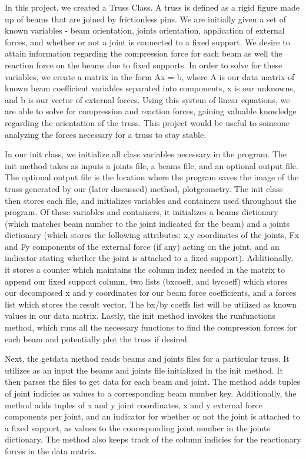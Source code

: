 \documentclass{article}
\begin{document}
In this project, we created a Truss Class. A truss is defined as a rigid
figure made up of beams that are joined by frictionless pins.
We are initially given a set of known variables - 
beam orientation, joints orientation, application of external forces, 
and whether or not a joint is connected to a fixed support. We desire 
to attain information regarding the compression force for each beam 
as well the reaction force on the beams due to fixed supports. In order
to solve for these variables, we create a matrix in the form Ax = b, 
where A is our data matrix of known beam coefficient variables separated
into components, x is our unknowns, and b is our vector of external forces.
Using this system of linear equations, we are able to solve for 
compression and reaction forces, gaining valuable knowledge regarding 
the orientation of the truss. This project would be useful to someone 
analyzing the forces necessary for a truss to stay stable. 

In our init class, we initialize all class variables necessary in the 
program. The init method takes as inputs a joints file, a beams file, and
an optional output file. The optional output file is the location where
the program saves the image of the truss generated by our (later discussed)
method, plotgeometry. The init class then stores each file, and initializes
variables and containers used throughout the program. Of these variables 
and containers, it initializes a beams dictionary (which matches beam 
number to the joint indicated for the beam) and a joints dictionary (which
stores the following attributes: x,y coordinates of the joints, Fx and Fy
components of the external force (if any) acting on the joint, and an 
indicator stating whether the joint is attached to a fixed support).
Additionally, it stores a counter which maintains the column index 
needed in the matrix to append our fixed support column, two lists (bxcoeff, 
and bycoeff) which stores our decomposed x and y coordinates for our beam force
coefficients, and a forces list which stores the result vector. The bx/by
coeffs list will be utilized as known values in our data matrix. Lastly, 
the init method invokes the runfunctions method, which runs all the necessary
functions to find the compression forces for each beam and potentially 
plot the truss if desired.  

Next, the getdata method reads beams and joints files for a particular truss. 
It utilizes as an input the beams and joints file initialized in the init 
method. It then parses the files to get data for each beam and joint. 
The method adds tuples of joint indicies as values to a corresponding 
beam number key. Additionally, the method adds tuples of x and y joint 
coordinates, x and y external force components per joint, and an indicator 
for whether or not the joint is attached to a fixed support, as values 
to the cooresponding joint number in the joints dictionary. The method 
also keeps track of the column indicies for the reactionary forces 
in the data matrix. 
\end{document}
